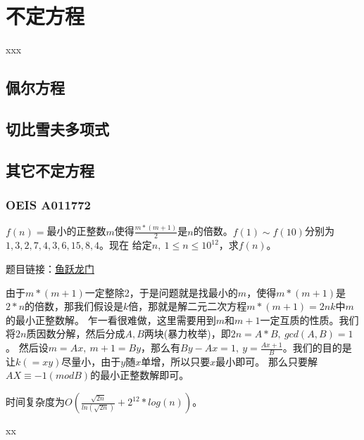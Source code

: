 \chapter{不定方程}

\begin{introduction}
	\item xxx
\end{introduction}

\section{佩尔方程}


\section{切比雪夫多项式}

\section{其它不定方程}

\subsection{OEIS A011772}
$f(n)=$最小的正整数$m$使得$\frac{m*(m+1)}{2}$是$n$的倍数。$f(1)\sim f(10)$分别为$1, 3, 2, 7, 4, 3, 6, 15, 8, 4$。现在
给定$n,\ 1\le n\le 10^{12}$，求$f(n)$。

题目链接：\href{https://www.cometoj.com/contest/65/problem/C?problem_id=3684}{鱼跃龙门}

\begin{solution}
	由于$m*(m+1)$一定整除2，于是问题就是找最小的$m$，使得$m*(m+1)$是$2*n$的倍数，那我们假设是$k$倍，那就是解二元二次方程$m*(m+1) = 2nk$中$m$的最小正整数解。
	乍一看很难做，这里需要用到$m$和$m+1$一定互质的性质。我们将$2n$质因数分解，然后分成$A,B$两块(暴力枚举)，即$2n = A*B,\ gcd(A,B)=1$。
	然后设$m=Ax,\ m+1=By$，那么有$By-Ax=1,\ y=\frac{Ax+1}{B}$。我们的目的是让$k(=xy)$尽量小，由于$y$随$x$单增，所以只要$x$最小即可。
	那么只要解$AX\equiv -1  (mod B)$的最小正整数解即可。
	
	时间复杂度为$O(\frac{\sqrt{2n}}{ln(\sqrt{2n})}+2^{12}*log(n))$。
\end{solution}


	

\vbox{}

\vbox{}	

\begin{problemset}
	\item xx
\end{problemset}